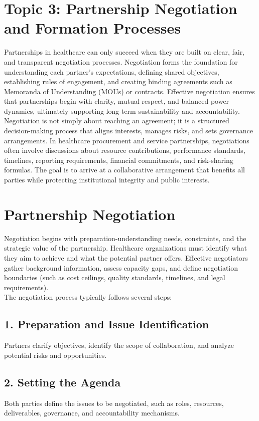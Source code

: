 \documentclass[10pt]{article}
\begin{document}
\section*{Topic 3: Partnership Negotiation and Formation Processes}
Partnerships in healthcare can only succeed when they are built on clear, fair, and transparent negotiation processes. Negotiation forms the foundation for understanding each partner's expectations, defining shared objectives, establishing rules of engagement, and creating binding agreements such as Memoranda of Understanding (MOUs) or contracts. Effective negotiation ensures that partnerships begin with clarity, mutual respect, and balanced power dynamics, ultimately supporting long-term sustainability and accountability.\\
Negotiation is not simply about reaching an agreement; it is a structured decision-making process that aligns interests, manages risks, and sets governance arrangements. In healthcare procurement and service partnerships, negotiations often involve discussions about resource contributions, performance standards, timelines, reporting requirements, financial commitments, and risk-sharing formulas. The goal is to arrive at a collaborative arrangement that benefits all parties while protecting institutional integrity and public interests.

\section*{Partnership Negotiation}
Negotiation begins with preparation-understanding needs, constraints, and the strategic value of the partnership. Healthcare organizations must identify what they aim to achieve and what the potential partner offers. Effective negotiators gather background information, assess capacity gaps, and define negotiation boundaries (such as cost ceilings, quality standards, timelines, and legal requirements).\\
The negotiation process typically follows several steps:

\subsection*{1. Preparation and Issue Identification}
Partners clarify objectives, identify the scope of collaboration, and analyze potential risks and opportunities.

\subsection*{2. Setting the Agenda}
Both parties define the issues to be negotiated, such as roles, resources, deliverables, governance, and accountability mechanisms.
\end{document}
